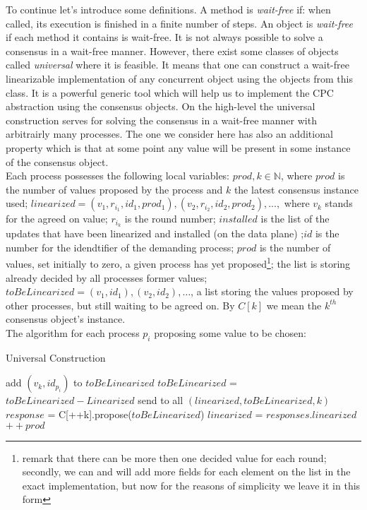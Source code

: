 \documentclass{article}
\begin{document}
To continue let's introduce some definitions. A method is \emph{wait-free} if: when called, its execution is finished in a finite number of steps. An object is \emph{wait-free} if each method it contains is wait-free. 
It is not always possible to solve a consensus in a wait-free manner. However, there exist some classes of objects called \emph{universal} where it is feasible. It means that one can construct a wait-free linearizable implementation of any concurrent object using the objects from this class. It is a powerful generic tool which will help us to implement the CPC abstraction using the consensus objects.  
On the high-level the universal construction serves for solving the consensus in a wait-free manner with arbitrairly many processes. The one we consider here has also an additional property which is that at some point any value will be present in some instance of the consensus object.\\
Each process possesses the following local variables: $prod,k\in\mathbb{N}$, where $prod$ is the number of values proposed by the process and $k$ the latest consensus instance used; $linearized=(v_1,r_{i_1},id_1,prod_1),(v_2,r_{i_2},id_2,prod_2),...,$ where $v_k$ stands for the agreed on value; $r_{i_k}$ is the round number; $installed$ is the list of the updates that have been linearized and installed (on the data plane) ;$id$ is the number for the idendtifier of the demanding process; $prod$ is the number of values, set initially to zero, a given process has yet proposed\footnote{remark that there can be more then one decided value for each round; secondly, we can and will add more fields for each element on the list in the exact implementation, but now for the reasons of simplicity we leave it in this form}; the list is storing already decided by all processes former values; $toBeLinearized = (v_1,id_1),(v_2,id_2),\ldots$, a list storing the values proposed by other processes, but still waiting to be agreed on. By $C[k]$ we mean the $k^{th}$ consensus object's instance. \\
The algorithm for each process $p_i$ proposing some value to be chosen:
\begin{algorithm}
  \caption{Universal Construction}\label{Universal}
  \begin{algorithmic}[1]
   \State add $(v_k,id_{p_i})$ to $toBeLinearized$
   \State $toBeLinearized$ = $toBeLinearized - Linearized$
   \State send to all $(linearized, toBeLinearized,k)$
   	\Repeat
   		\State $response$ = C[++k].propose($toBeLinearized$)
   		\State $linearized$ = $responses.linearized$
   	\State $++prod$
  \end{algorithmic}
\end{algorithm}
\end{document}
